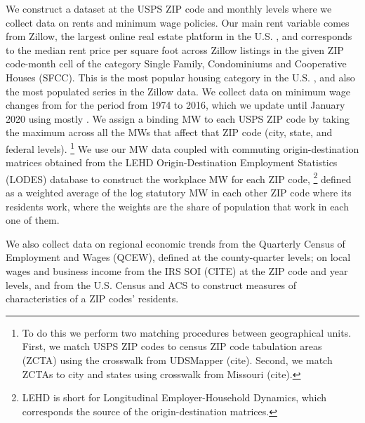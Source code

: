 We construct a dataset at the USPS ZIP code and monthly levels where we collect
data on rents and minimum wage policies.
Our main rent variable comes from Zillow, the largest online real estate platform 
in the U.S. \parencite{realestateagentpdx, investopedia}, and corresponds to the 
median rent price per square foot across Zillow listings in the given ZIP code-month 
cell of the category Single Family, Condominiums and Cooperative Houses (SFCC).
This is the most popular housing category in the U.S. \parencite{fernald2020americas}, 
and also the most populated series in the Zillow data.
We collect data on minimum wage changes from \textcite{VaghulZipperer2016} for the 
period from 1974 to 2016, which we update until January 2020 using mostly
\textcite{BerkeleyLaborCenter}.
We assign a binding MW to each USPS ZIP code by taking the maximum across all the
MWs that affect that ZIP code (city, state, and federal levels).%
\footnote{To do this we perform two matching procedures between geographical units.
First, we match USPS ZIP codes to census ZIP code tabulation areas (ZCTA) using 
the crosswalk from UDSMapper (cite).
Second, we match ZCTAs to city and states using crosswalk from Missouri (cite).}
We use our MW data coupled with commuting origin-destination matrices obtained from 
the LEHD Origin-Destination Employment Statistics (LODES) database to construct the 
workplace MW for each ZIP code,%
\footnote{LEHD is short for Longitudinal Employer-Household Dynamics, which 
corresponds the source of the origin-destination matrices.}
defined as a weighted average of the log statutory MW in each other ZIP code where 
its residents work, where the weights are the share of population that work in each 
one of them.

We also collect data on regional economic trends from the Quarterly Census of 
Employment and Wages (QCEW), defined at the county-quarter levels; 
on local wages and business income from the IRS SOI (CITE) at the ZIP code and 
year levels, and from the U.S. Census and ACS to construct measures of 
characteristics of a ZIP codes' residents.


